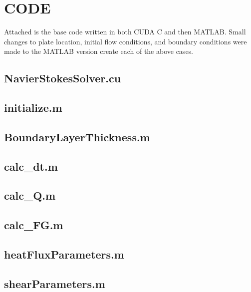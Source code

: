 \documentclass[10pt,a4paper]{article}
\begin{document}
\section*{CODE}

Attached is the base code written in both CUDA C and then MATLAB. Small changes to plate location, initial flow conditions, and boundary conditions were made to the MATLAB version create each of the above cases. 

\subsection*{NavierStokesSolver.cu}




\subsection*{initialize.m}


\subsection*{BoundaryLayerThickness.m}


\subsection*{calc\_dt.m}


\subsection*{calc\_Q.m}


\subsection*{calc\_FG.m}


\subsection*{heatFluxParameters.m}


\subsection*{shearParameters.m}

\end{document}
